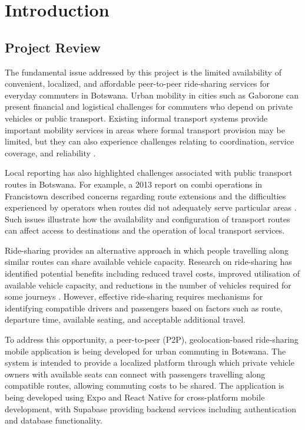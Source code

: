 \chapter{Introduction}
\label{ch:intro}

\section{Project Review}

The fundamental issue addressed by this project is the limited availability of convenient, localized, and affordable peer-to-peer ride-sharing services for everyday commuters in Botswana. Urban mobility in cities such as Gaborone can present financial and logistical challenges for commuters who depend on private vehicles or public transport. Existing informal transport systems provide important mobility services in areas where formal transport provision may be limited, but they can also experience challenges relating to coordination, service coverage, and reliability \citep{cervero2007}.

Local reporting has also highlighted challenges associated with public transport routes in Botswana. For example, a 2013 report on combi operations in Francistown described concerns regarding route extensions and the difficulties experienced by operators when routes did not adequately serve particular areas \citep{kebareng2013}. Such issues illustrate how the availability and configuration of transport routes can affect access to destinations and the operation of local transport services.

Ride-sharing provides an alternative approach in which people travelling along similar routes can share available vehicle capacity. Research on ride-sharing has identified potential benefits including reduced travel costs, improved utilisation of available vehicle capacity, and reductions in the number of vehicles required for some journeys \citep{agatz2012,furuhata2013}. However, effective ride-sharing requires mechanisms for identifying compatible drivers and passengers based on factors such as route, departure time, available seating, and acceptable additional travel.

To address this opportunity, a peer-to-peer (P2P), geolocation-based ride-sharing mobile application is being developed for urban commuting in Botswana. The system is intended to provide a localized platform through which private vehicle owners with available seats can connect with passengers travelling along compatible routes, allowing commuting costs to be shared. The application is being developed using Expo and React Native for cross-platform mobile development, with Supabase providing backend services including authentication and database functionality.

